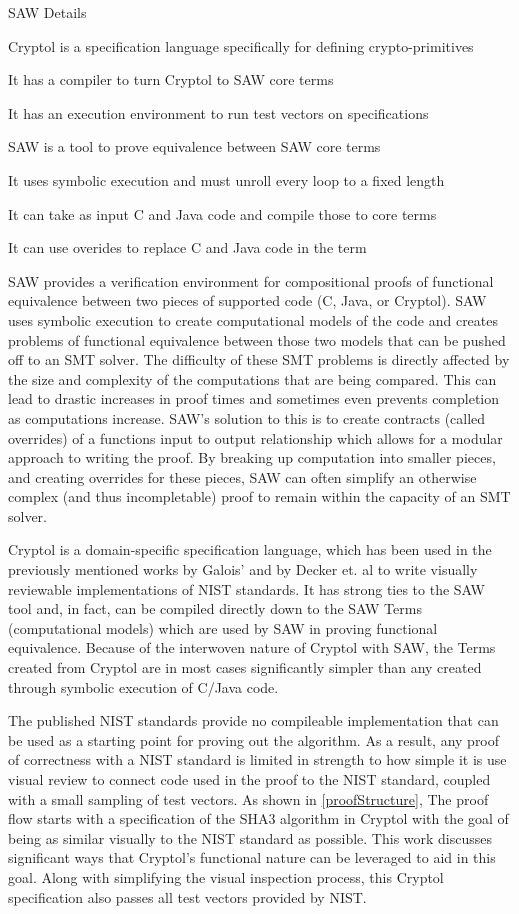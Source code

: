 SAW Details
\begin{compactitem}
  \item Cryptol is a specification language specifically for defining crypto-primitives
  \item It has a compiler to turn Cryptol to SAW core terms
  \item It has an execution environment to run test vectors on specifications
  \item SAW is a tool to prove equivalence between SAW core terms
  \item It uses symbolic execution and must unroll every loop to a fixed length
  \item It can take as input C and Java code and compile those to core terms
  \item It can use overides to replace C and Java code in the term
\end{compactitem}

SAW provides a verification environment for compositional proofs of functional equivalence between two pieces of supported code (C, Java, or Cryptol).
SAW uses symbolic execution to create computational models of the code and creates problems of functional equivalence between those two models that can be pushed off to an SMT solver.  
The difficulty of these SMT problems is directly affected by the size and complexity of the computations that are being compared.
This can lead to drastic increases in proof times and sometimes even prevents completion as computations increase.  
SAW's solution to this is to create contracts (called overrides) of a functions input to output relationship which allows for a modular approach to writing the proof.
By breaking up computation into smaller pieces, and creating overrides for these pieces, SAW can often simplify an otherwise complex (and thus incompletable) proof to remain within the capacity of an SMT solver.

Cryptol is a domain-specific specification language, which has been used in the previously mentioned works by Galois' and by Decker et. al to write visually reviewable implementations of NIST standards.
It has strong ties to the SAW tool and, in fact, can be compiled directly down to the SAW Terms (computational models) which are used by SAW in proving functional equivalence.
Because of the interwoven nature of Cryptol with SAW, the Terms created from Cryptol are in most cases significantly simpler than any created through symbolic execution of C/Java code.

The published NIST standards provide no compileable implementation that can be used as a starting point for proving out the algorithm.
As a result, any proof of correctness with a NIST standard is limited in strength to how simple it is use visual review to connect code used in the proof to the NIST standard, coupled with a small sampling of test vectors.
As shown in \ref{proofStructure}, The proof flow starts with a specification of the SHA3 algorithm in Cryptol with the goal of being as similar visually to the NIST standard as possible.
This work discusses significant ways that Cryptol's functional nature can be leveraged to aid in this goal.
Along with simplifying the visual inspection process, this Cryptol specification also passes all test vectors provided by NIST.

